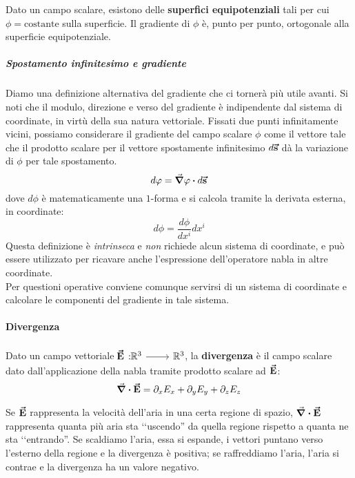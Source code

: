 \begin{observe}
	Dato un campo scalare, esistono delle \textbf{superfici equipotenziali} tali per cui $\phi=\text{costante}$ sulla superficie. Il gradiente di $\phi$ è, punto per punto, ortogonale alla superficie equipotenziale.
\end{observe}
\subparagraph{Spostamento infinitesimo e gradiente}
Diamo una definizione alternativa del gradiente che ci tornerà più utile avanti. Si noti che il modulo, direzione e verso del gradiente è indipendente dal sistema di coordinate, in virtù della sua natura vettoriale. Fissati due punti infinitamente vicini, possiamo considerare il gradiente del campo scalare $\phi$ come il vettore tale che il prodotto scalare per il vettore spostamente infinitesimo $d\vb*{\va{s}}$ dà la variazione di $\phi$ per tale spostamento.
\begin{equation}
	d\phi=\grad{\phi}\vdot d\vba{s}\label{gradienteintrinseco}
\end{equation}
dove $d\phi$ è matematicamente una $1$-forma e si calcola tramite la derivata esterna, in coordinate:
\begin{equation}
	d\phi=\frac{d\phi}{dx^i}dx^i
\end{equation}
Questa definizione è \textit{intrinseca} e \textit{non} richiede alcun sistema di coordinate, e può essere utilizzato per ricavare anche l'espressione dell'operatore nabla in altre coordinate.\\
Per questioni operative conviene comunque servirsi di un sistema di coordinate e calcolare le componenti del gradiente in tale sistema.
\paragraph{Divergenza}
\begin{define}[Divergenza]
	Dato un campo vettoriale $\funz[\vba{E}]{\realset^3}{\realset^3}$, la \textbf{divergenza} è il campo scalare dato dall'applicazione della nabla tramite prodotto scalare ad $\vb*{\va{E}}$:
	\begin{equation}
		\div{\vb*{\va{E}}}=\partial_xE_x+\partial_yE_y+\partial_zE_z
	\end{equation}
\end{define}
\begin{example}
	Se $\vb*{\va{E}}$ rappresenta la velocità dell'aria in una certa regione di spazio, $\div{ \vb*{\va{E}}}$ rappresenta quanta più aria sta ‘‘uscendo'' da quella regione rispetto a quanta ne sta ‘‘entrando''. Se scaldiamo l'aria, essa si espande, i vettori puntano verso l'esterno della regione e la divergenza è positiva; se raffreddiamo l'aria, l'aria si contrae e la divergenza ha un valore negativo.
\end{example}
